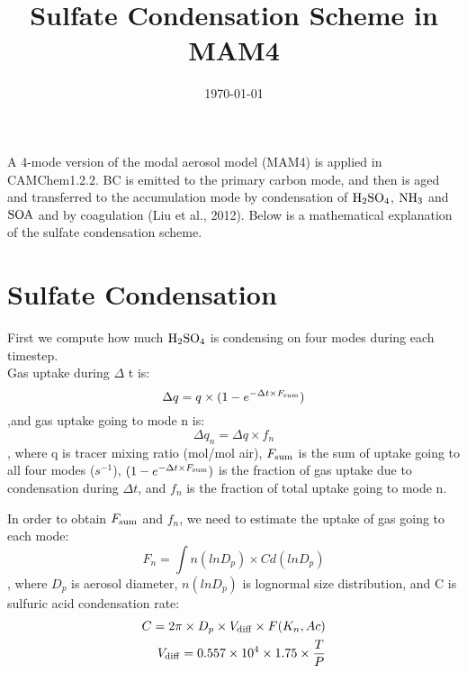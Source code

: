 \documentclass{article}
\begin{document}
\title{Sulfate Condensation Scheme in MAM4}
\author{}
\date{\today}
\maketitle

\begin{ }
  A 4-mode version of the modal aerosol model (MAM4) is applied in CAMChem1.2.2. BC is emitted to the primary carbon mode, and then is aged and transferred to the accumulation mode by condensation of $\rm{H_2SO_4}$, $\rm{NH_3}$ and $\rm{SOA}$ and by coagulation (Liu et al., 2012). Below is a mathematical explanation of the sulfate condensation scheme.
  \end{ }

\section{Sulfate Condensation}

	First we compute how much $\rm{H_2SO_4}$ is condensing on four modes during each timestep. \\



Gas uptake during $\Delta$ t is:
\begin{equation}
\Delta q = q \times (1 - e^{-\Delta t\times F_ {\rm{sum}}})
\end{equation}
,and gas uptake going to mode n is:
\begin{equation}
\Delta q_n = \Delta q \times f_n
\end{equation}
, where q is tracer mixing ratio (mol/mol air), $F_{\rm{sum}}$ is the sum of uptake going to all four modes ($s^{-1}$), $(1 - e^{-\Delta t\times F_{\rm{sum}}})$ is the fraction of gas uptake due to condensation during $\Delta t$, and $f_n$ is the fraction of total uptake going to mode n.
 

In order to obtain $F_{\rm{sum}}$ and $f_n$, we need to estimate the uptake of gas going to each mode:
\begin{equation}
F_n = \int n(lnD_p)\times C d(lnD_p)
\end{equation}
, where $D_p$ is aerosol diameter, $n(lnD_p)$ is lognormal size distribution, and C is sulfuric acid condensation rate:
\begin{align}
C = 2\pi \times D_p \times V_{\rm{diff}} \times F(K_n, Ac) \\
V_{\rm{diff}} = 0.557 \times 10^4 \times 1.75 \times \frac{T}{P} 
\end{align}
\end{document}
